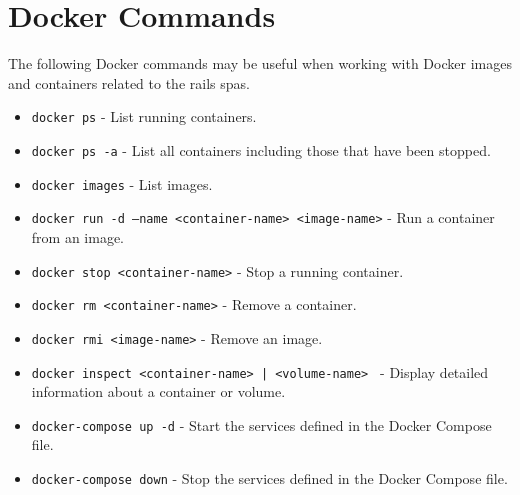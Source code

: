 \chapter{Docker Commands}
\label{app:dockercommands}
The following Docker commands may be useful when working with Docker images and containers related to the \gls{rails} \glspl{spa}.
\begin{itemize}
    \item \texttt{docker ps} - List running containers.
    \item \texttt{docker ps -a} - List all containers including those that have been stopped.
    \item \texttt{docker images} - List images.
    \item \texttt{docker run -d --name <container-name> <image-name>} - Run a container from an image.
    \item \texttt{docker stop <container-name>} - Stop a running container.
    \item \texttt{docker rm <container-name>} - Remove a container.
    \item \texttt{docker rmi <image-name>} - Remove an image.
    \item \texttt{docker inspect <container-name> | <volume-name> } - Display detailed information about a container or volume.
    \item \texttt{docker-compose up -d} - Start the services defined in the Docker Compose file.
    \item \texttt{docker-compose down} - Stop the services defined in the Docker Compose file.
\end{itemize}